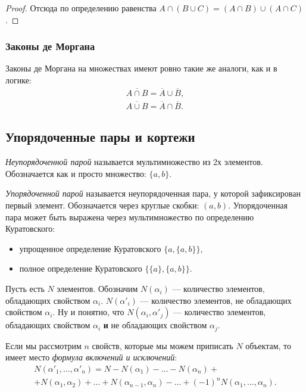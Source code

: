 \begin{multicols}{2}
\begin{proof}
      Отсюда по определению равенства $A \cap (B \cup C) = (A \cap B) \cup (A \cap C)$.
    \end{proof}
    
    \subsubsection*{Законы де Моргана}
    
    Законы де Моргана на множествах имеют ровно такие же аналоги, как и в логике:
    \begin{align*}
      \overline{A \cap B} = \overline{A} \cup \overline{B},
      \\
      \overline{A \cup B} = \overline{A} \cap \overline{B}.
    \end{align*}
    
    \subsection*{Упорядоченные пары и кортежи}
    
    \begin{definition}{}{}
      \textit{Неупорядоченной парой} называется мультимножество из 2х элементов. Обозначается как и просто множество: $\{a, b\}$.
    \end{definition}
    
    \begin{definition}{}{}
      \textit{Упорядоченной парой} называется неупорядоченная пара, у которой зафиксирован первый элемент. Обозначается через круглые скобки: $(a, b)$. Упорядоченная пара может быть выражена через мультимножество по определению Куратовского:
      \begin{itemize}
        \item упрощенное определение Куратовского $\{a, \{a, b\}\}$,
        \item полное определение Куратовского $\{\{a\}, \{a, b\}\}$.
      \end{itemize}
    \end{definition}

Пусть есть $N$ элементов. Обозначим $N(\alpha_i)$ --- количество элементов, обладающих свойством $\alpha_i$. $N(\alpha'_i)$ --- количество элементов, не обладающих свойством $\alpha_i$. Ну и понятно, что $N(\alpha_i, \alpha'_j)$ --- количество элементов, обладающих свойством $\alpha_i$ \textbf{и} не обладающих свойством $\alpha_j$.

\begin{theorema}{}{}
	Если мы рассмотрим $n$ свойств, которые мы можем приписать $N$ объектам, то имеет место \textit{формула включений и исключений}:
	\begin{multline*}
		N(\alpha'_1, \ldots, \alpha'_n) = N - N(\alpha_1) - \ldots - N(\alpha_n) + \\ +
		N(\alpha_1, \alpha_2) + \ldots + N(\alpha_{n - 1}, \alpha_n) - \ldots + (-1)^n N(\alpha_1, \ldots, \alpha_n).
	\end{multline*}
\end{theorema}


\end{multicols}
